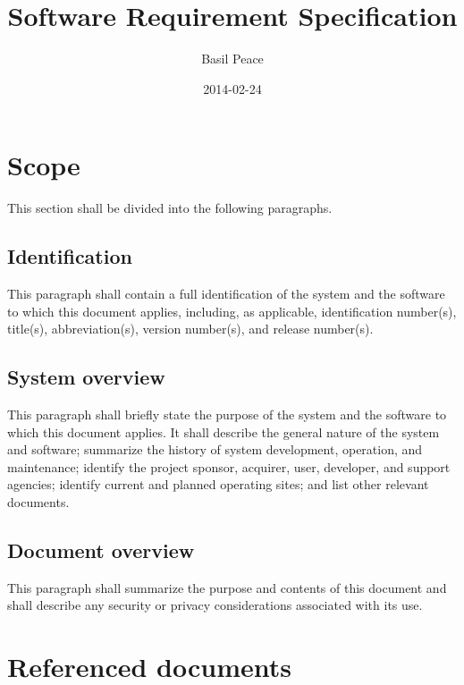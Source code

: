 \documentclass{fidata-report-template}
\begin{document}
\frontmatter

\title{Software Requirement Specification}

\date{2014-02-24}

\author{Basil Peace}

\maketitle
\tableofcontents

\section{Scope}

This section shall be divided into the following paragraphs.

\subsection{Identification}

This paragraph shall contain a full identification of the system and the
software to which this document applies, including, as applicable,
identification number(s), title(s), abbreviation(s), version number(s),
and release number(s).

\subsection{System overview}

This paragraph shall briefly state the purpose of the system and the
software to which this document applies. It shall describe the general
nature of the system and software; summarize the history of system
development, operation, and maintenance; identify the project sponsor,
acquirer, user, developer, and support agencies; identify current and
planned operating sites; and list other relevant documents.

\subsection{Document overview}

This paragraph shall summarize the purpose and contents of this document
and shall describe any security or privacy considerations associated
with its use.

\section{Referenced documents}
\end{document}
